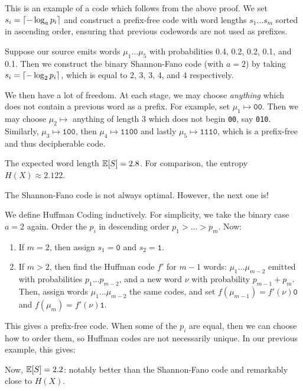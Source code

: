 \documentclass{article}
\begin{document}
\begin{example}
    This is an example of a code which follows from the above proof.
    We set $s_i = \left\lceil- \log_a p_i\right\rceil$
    and construct a prefix-free code with word lengths $s_1 \dots s_m$
    sorted in ascending order,
    ensuring that previous codewords are not used as prefixes.
    
    Suppose our source emits words $\mu_1 \dots \mu_5$
    with probabilities 0.4, 0.2, 0.2, 0.1, and 0.1.
    Then we construct the binary Shannon-Fano code (with $a=2$)
    by taking $s_i = \left\lceil-\log_2 p_i\right\rceil$,
    which is equal to 2, 3, 3, 4, and 4 respectively.
    
    We then have a lot of freedom.
    At each stage, we may choose \textit{anything}
    which does not contain a previous word as a prefix.
    For example, set $\mu_1 \mapsto \texttt{00}$.
    Then we may choose $\mu_2 \mapsto$ anything of length 3
    which does not begin \texttt{00}, say \texttt{010}.
    Similarly, $\mu_3 \mapsto \texttt{100}$,
    then $\mu_4 \mapsto \texttt{1100}$
    and lastly $\mu_5 \mapsto \texttt{1110}$,
    which is a prefix-free and thus decipherable code.
    
    The expected word length $\mathbb{E}[S] = 2.8$.
    For comparison, the entropy $H(X) \approx 2.122$.
\end{example}

\begin{note}
	The Shannon-Fano code is not always optimal.
	However, the next one is!
\end{note}

\begin{example}
    We define Huffman Coding inductively.
    For simplicity, we take the binary case $a = 2$ again.
    Order the $p_i$ in descending order $p_1 > \dots > p_m$. Now:
    
    \begin{enumerate}
    	\item If $m=2$, then assign $s_1 = \texttt{0}$ and $s_2 = \texttt{1}$.
    	\item If $m>2$, then find the Huffman code $f'$ for $m-1$ words: $\mu_1 \dots \mu_{m-2}$ emitted with probabilities $p_1 \dots p_{m-2}$, and a new word $\nu$ with probability $p_{m-1} + p_m$. Then, assign words $\mu_1 \dots \mu_{m-2}$ the same codes, and set $f(\mu_{m-1}) = f'(\nu)\texttt{0}$ and $f(\mu_{m}) = f'(\nu)\texttt{1}$.
	\end{enumerate}
	
	This gives a prefix-free code.
	When some of the $p_i$ are equal,
	then we can choose how to order them,
	so Huffman codes are not necessarily unique.
	In our previous example, this gives:
	
	
	Now, $\mathbb{E}[S] = 2.2$:
	notably better than the Shannon-Fano code
	and remarkably close to $H(X)$.
\end{example}
\end{document}

